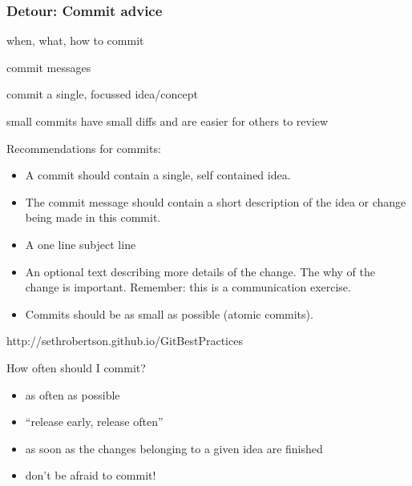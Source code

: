 \documentclass{git_course}
\begin{document}
\begin{frame}
\frametitle{Detour: Commit advice}

when, what, how to commit

commit messages

commit a single, focussed idea/concept

small commits have small diffs and are easier for others to review

Recommendations for commits:

\begin{itemize}
    \item A commit should contain a single, self contained idea.
    \item The commit message should contain a short description
        of the idea or change being made in this commit.
    \item A one line subject line
    \item An optional text describing more details of the change. The
        why of the change is important. Remember: this is a
        communication exercise.
    \item Commits should be as small as possible (atomic commits).
\end{itemize}

    http://sethrobertson.github.io/GitBestPractices

How often should I commit?
\begin{itemize}
    \item as often as possible
    \item “release early, release often”
    \item as soon as the changes belonging to a given idea are
        ﬁnished
    \item don’t be afraid to commit!
\end{itemize}

\end{frame}
\end{document}
